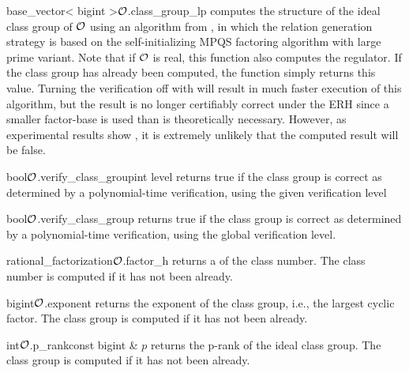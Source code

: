 \begin{fcode}{base_vector< bigint >}{$\mathcal{O}$.class_group_lp}{}
  computes the structure of the ideal class group of $\mathcal{O}$ using an algorithm from
  \cite{Jacobson_Thesis:1999}, in which the relation generation strategy is based on the
  self-initializing MPQS factoring algorithm with large prime variant.  Note that if $\mathcal{O}$ is
  real, this function also computes the regulator.  If the class group has already been
  computed, the function simply returns this value.  Turning the verification off with
   will result in much faster execution of this
  algorithm, but the result is no longer certifiably correct under the ERH since a smaller
  factor-base is used than is theoretically necessary.  However, as experimental results show
  \cite{Jacobson:1998}, it is extremely unlikely that the computed result will be false.
\end{fcode}

\begin{fcode}{bool}{$\mathcal{O}$.verify_class_group}{int level}
  returns true if the class group is correct as determined by a polynomial-time verification,
  using the given verification level
\end{fcode}

\begin{fcode}{bool}{$\mathcal{O}$.verify_class_group}{}
  returns true if the class group is correct as determined by a polynomial-time verification,
  using the global verification level.
\end{fcode}




\begin{fcode}{rational_factorization}{$\mathcal{O}$.factor_h}{}
  returns a  of the class number.  The class number is computed if
  it has not been already.
\end{fcode}

\begin{fcode}{bigint}{$\mathcal{O}$.exponent}{}
  returns the exponent of the class group, i.e., the largest cyclic factor.  The class group is
  computed if it has not been already.
\end{fcode}

\begin{fcode}{int}{$\mathcal{O}$.p_rank}{const bigint & $p$}
  returns the p-rank of the ideal class group.  The class group is computed if it has not been
  already.
\end{fcode}

